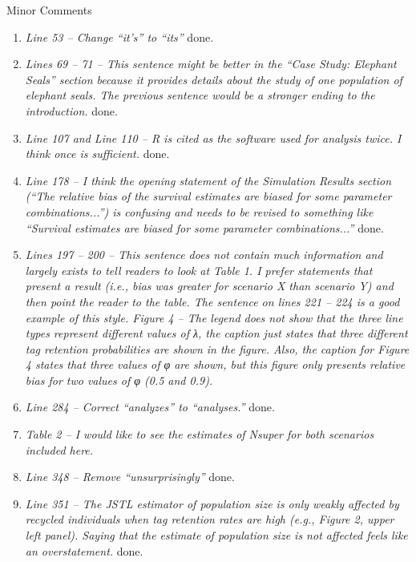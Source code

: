 \documentclass[12pt]{article}
\begin{document}
\begin{enumerate}
\noindent Minor Comments
\begin{enumerate}
\item {\it Line 53 – Change “it’s” to “its”} 
done.

\item {\it Lines 69 – 71 – This sentence might be better in the “Case Study: Elephant Seals” section because it provides details about the study of one population of elephant seals. The previous sentence would be a stronger ending to the introduction.} 
done.

\item {\it Line 107 and Line 110 – R is cited as the software used for analysis twice. I think once is sufficient.} 
done.

\item {\it Line 178 – I think the opening statement of the Simulation Results section (“The relative bias of the survival estimates are biased for some parameter combinations...”) is confusing and needs to be revised to something like “Survival estimates are biased for some parameter combinations...”} 
done.

\item {\it Lines 197 – 200 – This sentence does not contain much information and largely exists to tell readers to look at Table 1. I prefer statements that present a result (i.e., bias was greater for scenario X than scenario Y) and then point the reader to the table. The sentence on lines 221 – 224 is a good example of this style.
Figure 4 – The legend does not show that the three line types represent different values of λ, the caption just states that three different tag retention probabilities are shown in the figure. Also, the caption for Figure 4 states that three values of φ are shown, but this figure only presents relative bias for two values of φ (0.5 and 0.9).}

\item {\it Line 284 – Correct “analyzes” to “analyses.”} 
done.

\item {\it Table 2 – I would like to see the estimates of Nsuper for both scenarios included here.}

\item {\it Line 348 – Remove “unsurprisingly”} 
done.

\item {\it Line 351 – The JSTL estimator of population size is only weakly affected by recycled individuals when tag retention rates are high (e.g., Figure 2, upper left panel). Saying that the estimate of population size is not affected feels like an overstatement.} done.


\end{enumerate}
\end{enumerate}
\end{document}
